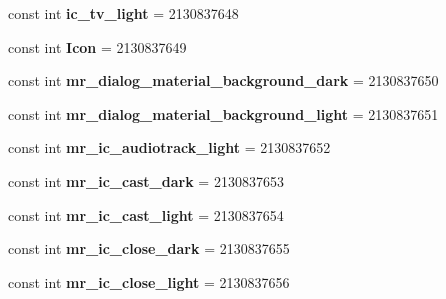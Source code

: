 \begin{DoxyCompactItemize}
\mbox{\label{classXaria_1_1Resource_1_1Drawable_ae20d651b8b5346fcf44f4bfc61f04ff4}} 
const int {\bfseries ic\+\_\+tv\+\_\+light} = 2130837648
\item 
\mbox{\label{classXaria_1_1Resource_1_1Drawable_a13e94d7037cc845ed2b813b1c84d69b5}} 
const int {\bfseries Icon} = 2130837649
\item 
\mbox{\label{classXaria_1_1Resource_1_1Drawable_af4168ec4fd39d14c23b51f5b81afec8d}} 
const int {\bfseries mr\+\_\+dialog\+\_\+material\+\_\+background\+\_\+dark} = 2130837650
\item 
\mbox{\label{classXaria_1_1Resource_1_1Drawable_a6643585d408be744ab4d846584f7a426}} 
const int {\bfseries mr\+\_\+dialog\+\_\+material\+\_\+background\+\_\+light} = 2130837651
\item 
\mbox{\label{classXaria_1_1Resource_1_1Drawable_ace271fdf697d5dd15bba4e8ff361cee4}} 
const int {\bfseries mr\+\_\+ic\+\_\+audiotrack\+\_\+light} = 2130837652
\item 
\mbox{\label{classXaria_1_1Resource_1_1Drawable_ad01d603ea55ee16a84be9f1c79c1af89}} 
const int {\bfseries mr\+\_\+ic\+\_\+cast\+\_\+dark} = 2130837653
\item 
\mbox{\label{classXaria_1_1Resource_1_1Drawable_a17eb8cd27afe2ed1a1e36ff97a13476f}} 
const int {\bfseries mr\+\_\+ic\+\_\+cast\+\_\+light} = 2130837654
\item 
\mbox{\label{classXaria_1_1Resource_1_1Drawable_a16ffe22bf75b3979a5aa1d50a80664a0}} 
const int {\bfseries mr\+\_\+ic\+\_\+close\+\_\+dark} = 2130837655
\item 
\mbox{\label{classXaria_1_1Resource_1_1Drawable_aa789eb264dfc620f54052b4491e3527d}} 
const int {\bfseries mr\+\_\+ic\+\_\+close\+\_\+light} = 2130837656
\item 
\mbox{\label{classXaria_1_1Resource_1_1Drawable_a16bd4f1d7e842febde0d450d7310fc2a}} 

\end{DoxyCompactItemize}
